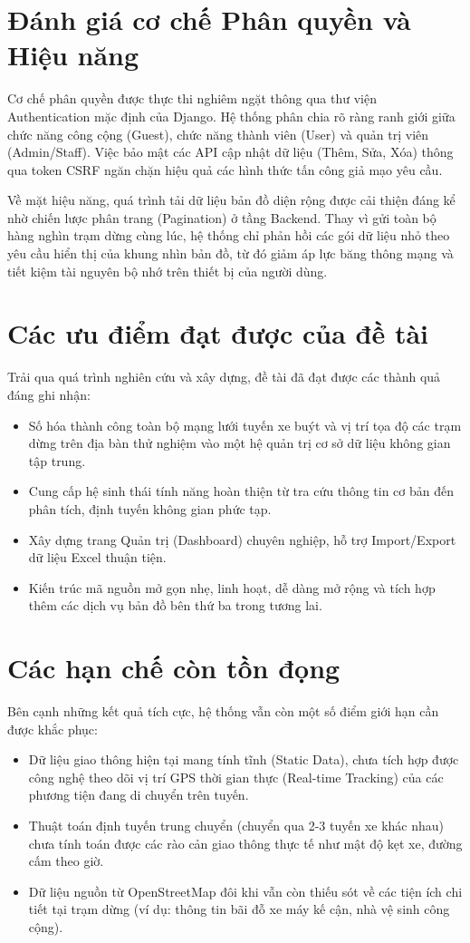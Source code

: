 \section{Đánh giá cơ chế Phân quyền và Hiệu năng}

Cơ chế phân quyền được thực thi nghiêm ngặt thông qua thư viện Authentication mặc định của Django. Hệ thống phân chia rõ ràng ranh giới giữa chức năng công cộng (Guest), chức năng thành viên (User) và quản trị viên (Admin/Staff). Việc bảo mật các API cập nhật dữ liệu (Thêm, Sửa, Xóa) thông qua token CSRF ngăn chặn hiệu quả các hình thức tấn công giả mạo yêu cầu.

Về mặt hiệu năng, quá trình tải dữ liệu bản đồ diện rộng được cải thiện đáng kể nhờ chiến lược phân trang (Pagination) ở tầng Backend. Thay vì gửi toàn bộ hàng nghìn trạm dừng cùng lúc, hệ thống chỉ phản hồi các gói dữ liệu nhỏ theo yêu cầu hiển thị của khung nhìn bản đồ, từ đó giảm áp lực băng thông mạng và tiết kiệm tài nguyên bộ nhớ trên thiết bị của người dùng.

\section{Các ưu điểm đạt được của đề tài}

Trải qua quá trình nghiên cứu và xây dựng, đề tài đã đạt được các thành quả đáng ghi nhận:
\begin{itemize}
    \item Số hóa thành công toàn bộ mạng lưới tuyến xe buýt và vị trí tọa độ các trạm dừng trên địa bàn thử nghiệm vào một hệ quản trị cơ sở dữ liệu không gian tập trung.
    \item Cung cấp hệ sinh thái tính năng hoàn thiện từ tra cứu thông tin cơ bản đến phân tích, định tuyến không gian phức tạp.
    \item Xây dựng trang Quản trị (Dashboard) chuyên nghiệp, hỗ trợ Import/Export dữ liệu Excel thuận tiện.
    \item Kiến trúc mã nguồn mở gọn nhẹ, linh hoạt, dễ dàng mở rộng và tích hợp thêm các dịch vụ bản đồ bên thứ ba trong tương lai.
\end{itemize}

\section{Các hạn chế còn tồn đọng}

Bên cạnh những kết quả tích cực, hệ thống vẫn còn một số điểm giới hạn cần được khắc phục:
\begin{itemize}
    \item Dữ liệu giao thông hiện tại mang tính tĩnh (Static Data), chưa tích hợp được công nghệ theo dõi vị trí GPS thời gian thực (Real-time Tracking) của các phương tiện đang di chuyển trên tuyến.
    \item Thuật toán định tuyến trung chuyển (chuyển qua 2-3 tuyến xe khác nhau) chưa tính toán được các rào cản giao thông thực tế như mật độ kẹt xe, đường cấm theo giờ.
    \item Dữ liệu nguồn từ OpenStreetMap đôi khi vẫn còn thiếu sót về các tiện ích chi tiết tại trạm dừng (ví dụ: thông tin bãi đỗ xe máy kế cận, nhà vệ sinh công cộng).
\end{itemize}
